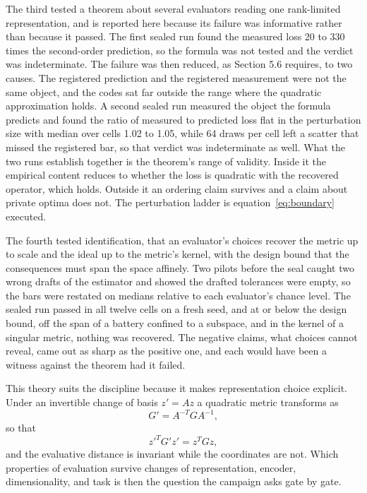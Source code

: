 \documentclass[11pt]{article}
\theoremstyle{remark}
\begin{document}
The third tested a theorem about several evaluators reading one rank-limited
representation, and is reported here because its failure was informative rather
than because it passed. The first sealed run found the measured loss 20 to 330
times the second-order prediction, so the formula was not tested and the verdict
was indeterminate. The failure was then reduced, as Section 5.6 requires, to two
causes. The registered prediction and the registered measurement were not the same
object, and the codes sat far outside the range where the quadratic approximation
holds. A second sealed run measured the object the formula predicts and found the
ratio of measured to predicted loss flat in the perturbation size with median over
cells 1.02 to 1.05, while 64 draws per cell left a scatter that missed the
registered bar, so that verdict was indeterminate as well. What the two runs
establish together is the theorem's range of validity. Inside it the empirical
content reduces to whether the loss is quadratic with the recovered operator, which
holds. Outside it an ordering claim survives and a claim about private optima does
not. The perturbation ladder is equation~\eqref{eq:boundary} executed.

The fourth tested identification, that an evaluator's choices recover the metric up
to scale and the ideal up to the metric's kernel, with the design bound that the
consequences must span the space affinely. Two pilots before the seal caught two
wrong drafts of the estimator and showed the drafted tolerances were empty, so the
bars were restated on medians relative to each evaluator's chance level. The sealed
run passed in all twelve cells on a fresh seed, and at or below the design bound,
off the span of a battery confined to a subspace, and in the kernel of a singular
metric, nothing was recovered. The negative claims, what choices cannot reveal,
came out as sharp as the positive one, and each would have been a witness against
the theorem had it failed.

This theory suits the discipline because it makes representation choice explicit.
Under an invertible change of basis $z' = Az$ a quadratic metric transforms as
\begin{equation}
G' = A^{-T} G A^{-1},
\end{equation}
so that
\begin{equation}
z'^{T} G' z' = z^{T} G z ,
\end{equation}
and the evaluative distance is invariant while the coordinates are not. Which
properties of evaluation survive changes of representation, encoder,
dimensionality, and task is then the question the campaign asks gate by gate.
\end{document}

